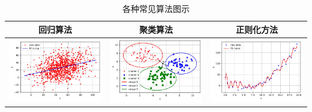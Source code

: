 \begin{longtable}{ccc}
  \caption{各种常见算法图示}
  \label{fig:2.5.2}\\
  \toprule
回归算法 & 聚类算法 & 正则化方法 
\tabularnewline
\midrule
\endhead
{\begin{minipage}{0.1\linewidth}
  \includegraphics[width=1.0\linewidth]{./img/ch2/sec1/1.jpg}
\end{minipage}}
&
{\begin{minipage}{0.1\linewidth}
\includegraphics[width=1.0\linewidth]{./img/ch2/sec1/2.jpg}  
\end{minipage}}
&
{\begin{minipage}{0.1\linewidth}
\includegraphics[width=1.0\linewidth]{./img/ch2/sec1/3.jpg}

\end{minipage}}
\end{longtable}
